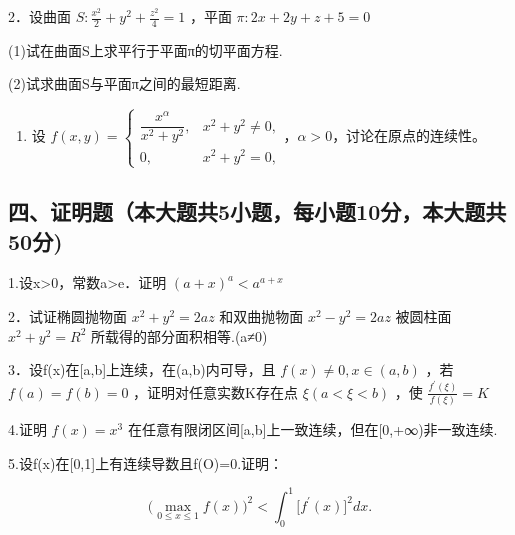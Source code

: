 \documentclass[11pt,fontset=fandol]{ctexart}
\providecommand{\tightlist}{\setlength{\itemsep}{0pt}\setlength{\parskip}{0pt}}
\begin{document}
2．设曲面
\(S : \frac { x ^ { 2 } } { 2 } + y ^ { 2 } + \frac { z ^ { 2 } } { 4 } = 1\)
，平面 \(\pi : 2 x + 2 y + z + 5 = 0\)

(1)试在曲面S上求平行于平面π的切平面方程.

(2)试求曲面S与平面π之间的最短距离.

\begin{enumerate}
\def\labelenumi{\arabic{enumi}.}
\setcounter{enumi}{2}
\tightlist
\item
  设
  \(f(x,y)=\begin{cases}\dfrac{x^\alpha}{x^2+y^2},&x^2+y^2\neq0,\\0,&x^2+y^2=0,\end{cases}\)，\(\alpha>0\)，讨论在原点的连续性。
\end{enumerate}

\subsection{四、证明题（本大题共5小题，每小题10分，本大题共50分)}\label{ux56dbux8bc1ux660eux9898ux672cux5927ux9898ux51715ux5c0fux9898ux6bcfux5c0fux989810ux5206ux672cux5927ux9898ux517150ux5206}

1.设x\textgreater0，常数a\textgreater e．证明
\(( a + x ) ^ { a } < a ^ { a + x }\)

2．试证椭圆抛物面 \(x ^ { 2 } + y ^ { 2 } = 2 a z\) 和双曲抛物面
\(x ^ { 2 } - y ^ { 2 } = 2 a z\)
被圆柱面\(x ^ { 2 } + y ^ { 2 } = R ^ { 2 }\) 所载得的部分面积相等.(a≠0)

3．设f(x)在{[}a,b{]}上连续，在(a,b)内可导，且
\(f ( x ) \neq 0 , x \in ( a , b )\) ，若\(f ( a ) = f ( b ) = 0\)
，证明对任意实数K存在点 \(\xi ( a < \xi < b )\) ，使
\({ \frac { f ^ { \prime } ( \xi ) } { f ( \xi ) } } = K\)

4.证明 \(f ( x ) = x ^ { 3 }\)
在任意有限闭区间{[}a,b{]}上一致连续，但在{[}0,+∞)非一致连续.

5.设f(x)在{[}0,1{]}上有连续导数且f(O)=0.证明：

\[
{ \Big ( } \operatorname* { m a x } _ { 0 \leq x \leq 1 } f ( x ) { \Big ) } ^ { 2 } < \int _ { 0 } ^ { 1 } { \big [ } f ^ { \prime } ( x ) { \big ] } ^ { 2 } d x .
\]
\end{document}

